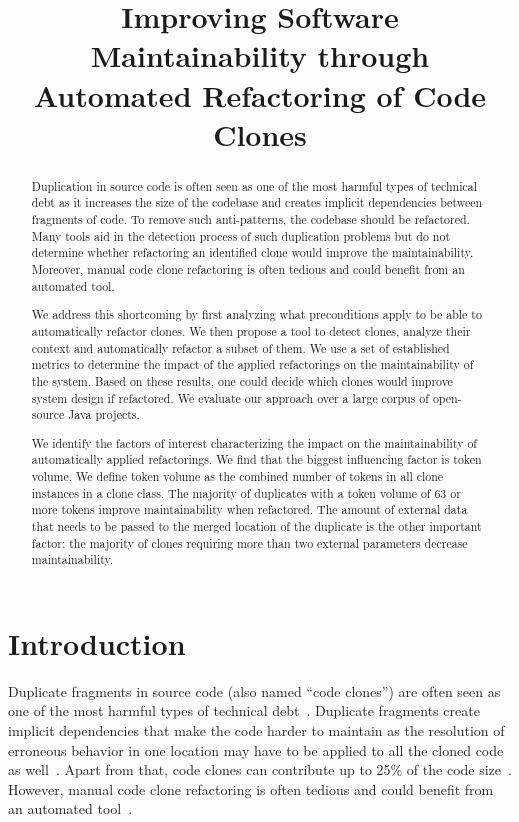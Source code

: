 \documentclass[a4paper,UKenglish,cleveref, autoref, thm-restate,authorcolumns]{lipics-v2019}
\title{Improving Software Maintainability through Automated Refactoring of Code Clones}
\author{}
\begin{document}


\begin{abstract}
Duplication in source code is often seen as one of the most harmful types of technical debt as it increases the size of the codebase and creates implicit dependencies between fragments of code. To remove such anti-patterns, the codebase should be refactored. Many tools aid in the detection process of such duplication problems but do not determine whether refactoring an identified clone would improve the maintainability. Moreover, manual code clone refactoring is often tedious and could benefit from an automated tool.

We address this shortcoming by first analyzing what preconditions apply to be able to automatically refactor clones. We then propose a tool to detect clones, analyze their context and automatically refactor a subset of them. We use a set of established metrics to determine the impact of the applied refactorings on the maintainability of the system. Based on these results, one could decide which clones would improve system design if refactored. We evaluate our approach over a large corpus of open-source Java projects.

We identify the factors of interest characterizing the impact on the maintainability of automatically applied refactorings. We find that the biggest influencing factor is token volume. We define token volume as the combined number of tokens in all clone instances in a clone class. The majority of duplicates with a token volume of 63 or more tokens improve maintainability when refactored. The amount of external data that needs to be passed to the merged location of the duplicate is the other important factor: the majority of clones requiring more than two external parameters decrease maintainability.
\end{abstract}

\maketitle

\section{Introduction}
Duplicate fragments in source code (also named ``code clones'') are often seen as one of the most harmful types of technical debt~\cite{fowler2018refactoring}. Duplicate fragments create implicit dependencies that make the code harder to maintain as the resolution of erroneous behavior in one location may have to be applied to all the cloned code as well~\cite{ostberg2014automatically}. Apart from that, code clones can contribute up to 25\% of the code size~\cite{bruntink2005use}. However, manual code clone refactoring is often tedious and could benefit from an automated tool~\cite{mazinanian2016jdeodorant}.
\end{document}
